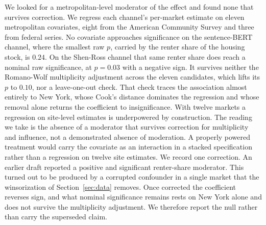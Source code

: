 We looked for a metropolitan-level moderator of the effect and found none that
survives correction. We regress each channel's per-market estimate on eleven metropolitan covariates, eight from the American Community Survey and three from federal series. No covariate approaches significance on the sentence-BERT channel, where the smallest raw $p$, carried by the renter share of the housing stock, is $0.24$. On the Shen-Ross channel that same renter share does reach a nominal raw significance, at $p=0.03$ with a negative sign. It survives neither the Romano-Wolf multiplicity adjustment across the eleven candidates, which lifts its $p$ to $0.10$, nor a leave-one-out check. That check traces the association almost entirely to New York, whose Cook's distance dominates the regression and whose removal alone returns the coefficient to insignificance. With twelve markets a regression on site-level estimates is underpowered by construction. The reading we take is the absence of a moderator that survives correction for multiplicity and influence, not a demonstrated absence of moderation. A properly powered treatment would carry the covariate as an interaction in a stacked specification rather than a regression on twelve site estimates. We record one correction. An earlier draft reported a positive and significant renter-share moderator. This turned out to be produced by a corrupted confounder in a single market that the winsorization of Section~\ref{sec:data} removes. Once corrected the coefficient reverses sign, and what nominal significance remains rests on New York alone and does not survive the multiplicity adjustment. We therefore report the null rather than carry the superseded claim.
